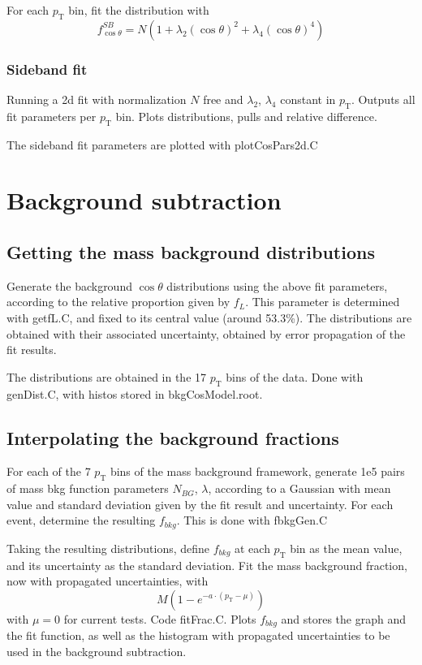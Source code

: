 \documentclass{article}
\newcommand{\pt}{p_\text{T}}
\newcommand{\cost}{\cos\theta}
\begin{document}
For each $\pt$ bin, fit the distribution with
\begin{equation}
f_{\cost}^{SB} = N\left(1+\lambda_2(\cost)^2+\lambda_4(\cost)^4\right)
\end{equation}

\subsubsection{Sideband fit}

Running a 2d fit with normalization $N$ free and $\lambda_2$, $\lambda_4$ constant in $\pt$. Outputs all fit parameters per $\pt$ bin. Plots distributions, pulls and relative difference.

The sideband fit parameters are plotted with plotCosPars2d.C

\pagebreak

\section{Background subtraction}

\subsection{Getting the mass background distributions}

Generate the background $\cost$ distributions using the above fit parameters, according to the relative proportion given by $f_L$. This parameter is determined with getfL.C, and fixed to its central value (around 53.3\%). The distributions are obtained with their associated uncertainty, obtained by error propagation of the fit results.

The distributions are obtained in the 17 $\pt$ bins of the data. Done with genDist.C, with histos stored in bkgCosModel.root.

\subsection{Interpolating the background fractions}

For each of the 7 $\pt$ bins of the mass background framework, generate 1e5 pairs of mass bkg function parameters $N_{BG}$, $\lambda$, according to a Gaussian with mean value and standard deviation given by the fit result and uncertainty. For each event, determine the resulting $f_{bkg}$. This is done with fbkgGen.C

Taking the resulting distributions, define $f_{bkg}$ at each $\pt$ bin as the mean value, and its uncertainty as the standard deviation. Fit the mass background fraction, now with propagated uncertainties, with 
\begin{equation}
M\left(1-e^{-a\cdot(\pt-\mu)}\right)
\end{equation}
with $\mu=0$ for current tests. Code fitFrac.C. Plots $f_{bkg}$ and stores the graph and the fit function, as well as the histogram with propagated uncertainties to be used in the background subtraction.
\end{document}
